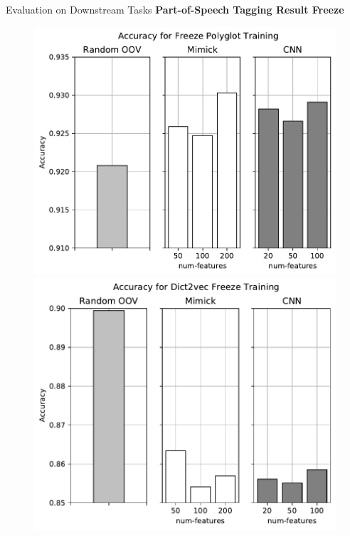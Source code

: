 \documentclass{beamer}
\begin{document}
\begin{frame}{Evaluation on Downstream Tasks}
    \textbf{Part-of-Speech Tagging Result Freeze}
    \begin{figure}[H]
        \centering
        \begin{minipage}{.48\textwidth}
            \includegraphics[width=\linewidth]{images/freeze_polyglot}
        \end{minipage}
        \begin{minipage}{.48\textwidth}
            \includegraphics[width=\linewidth]{images/freeze_dict2vec}
        \end{minipage}
    \end{figure}
\end{frame}
\end{document}
